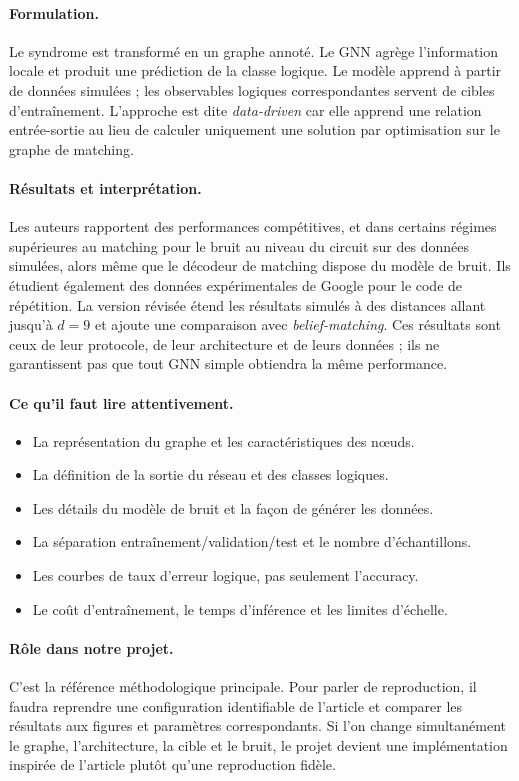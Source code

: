 \documentclass[11pt,a4paper]{article}
\begin{document}
\paragraph{Formulation.}
Le syndrome est transformé en un graphe annoté. Le GNN agrège l'information
locale et produit une prédiction de la classe logique. Le modèle apprend à
partir de données simulées ; les observables logiques correspondantes
servent de cibles d'entraînement. L'approche est dite \emph{data-driven}
car elle apprend une relation entrée-sortie au lieu de calculer uniquement
une solution par optimisation sur le graphe de matching.

\paragraph{Résultats et interprétation.}
Les auteurs rapportent des performances compétitives, et dans certains
régimes supérieures au matching pour le bruit au niveau du circuit sur des
données simulées, alors même que le décodeur de matching dispose du modèle
de bruit. Ils étudient également des données expérimentales de Google pour
le code de répétition. La version révisée étend les résultats simulés à des
distances allant jusqu'à $d=9$ et ajoute une comparaison avec
\emph{belief-matching}. Ces résultats sont ceux de leur protocole, de leur
architecture et de leurs données ; ils ne garantissent pas que tout GNN
simple obtiendra la même performance.

\paragraph{Ce qu'il faut lire attentivement.}
\begin{itemize}
 \item La représentation du graphe et les caractéristiques des nœuds.
 \item La définition de la sortie du réseau et des classes logiques.
 \item Les détails du modèle de bruit et la façon de générer les données.
 \item La séparation entraînement/validation/test et le nombre d'échantillons.
 \item Les courbes de taux d'erreur logique, pas seulement l'accuracy.
 \item Le coût d'entraînement, le temps d'inférence et les limites d'échelle.
\end{itemize}

\paragraph{Rôle dans notre projet.}
C'est la référence méthodologique principale. Pour parler de reproduction,
il faudra reprendre une configuration identifiable de l'article et comparer
les résultats aux figures et paramètres correspondants. Si l'on change
simultanément le graphe, l'architecture, la cible et le bruit, le projet
devient une implémentation inspirée de l'article plutôt qu'une reproduction
fidèle.
\end{document}

